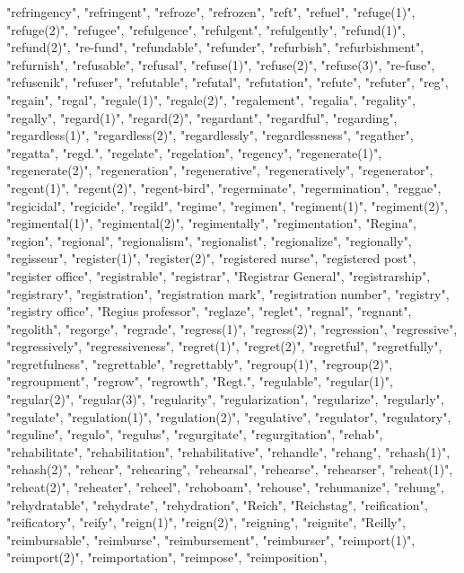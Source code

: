 "refringency",
"refringent",
"refroze",
"refrozen",
"reft",
"refuel",
"refuge(1)",
"refuge(2)",
"refugee",
"refulgence",
"refulgent",
"refulgently",
"refund(1)",
"refund(2)",
"re-fund",
"refundable",
"refunder",
"refurbish",
"refurbishment",
"refurnish",
"refusable",
"refusal",
"refuse(1)",
"refuse(2)",
"refuse(3)",
"re-fuse",
"refusenik",
"refuser",
"refutable",
"refutal",
"refutation",
"refute",
"refuter",
"reg",
"regain",
"regal",
"regale(1)",
"regale(2)",
"regalement",
"regalia",
"regality",
"regally",
"regard(1)",
"regard(2)",
"regardant",
"regardful",
"regarding",
"regardless(1)",
"regardless(2)",
"regardlessly",
"regardlessness",
"regather",
"regatta",
"regd.",
"regelate",
"regelation",
"regency",
"regenerate(1)",
"regenerate(2)",
"regeneration",
"regenerative",
"regeneratively",
"regenerator",
"regent(1)",
"regent(2)",
"regent-bird",
"regerminate",
"regermination",
"reggae",
"regicidal",
"regicide",
"regild",
"regime",
"regimen",
"regiment(1)",
"regiment(2)",
"regimental(1)",
"regimental(2)",
"regimentally",
"regimentation",
"Regina",
"region",
"regional",
"regionalism",
"regionalist",
"regionalize",
"regionally",
"regisseur",
"register(1)",
"register(2)",
"registered nurse",
"registered post",
"register office",
"registrable",
"registrar",
"Registrar General",
"registrarship",
"registrary",
"registration",
"registration mark",
"registration number",
"registry",
"registry office",
"Regius professor",
"reglaze",
"reglet",
"regnal",
"regnant",
"regolith",
"regorge",
"regrade",
"regress(1)",
"regress(2)",
"regression",
"regressive",
"regressively",
"regressiveness",
"regret(1)",
"regret(2)",
"regretful",
"regretfully",
"regretfulness",
"regrettable",
"regrettably",
"regroup(1)",
"regroup(2)",
"regroupment",
"regrow",
"regrowth",
"Regt.",
"regulable",
"regular(1)",
"regular(2)",
"regular(3)",
"regularity",
"regularization",
"regularize",
"regularly",
"regulate",
"regulation(1)",
"regulation(2)",
"regulative",
"regulator",
"regulatory",
"reguline",
"regulo",
"regulus",
"regurgitate",
"regurgitation",
"rehab",
"rehabilitate",
"rehabilitation",
"rehabilitative",
"rehandle",
"rehang",
"rehash(1)",
"rehash(2)",
"rehear",
"rehearing",
"rehearsal",
"rehearse",
"rehearser",
"reheat(1)",
"reheat(2)",
"reheater",
"reheel",
"rehoboam",
"rehouse",
"rehumanize",
"rehung",
"rehydratable",
"rehydrate",
"rehydration",
"Reich",
"Reichstag",
"reification",
"reificatory",
"reify",
"reign(1)",
"reign(2)",
"reigning",
"reignite",
"Reilly",
"reimbursable",
"reimburse",
"reimbursement",
"reimburser",
"reimport(1)",
"reimport(2)",
"reimportation",
"reimpose",
"reimposition",
